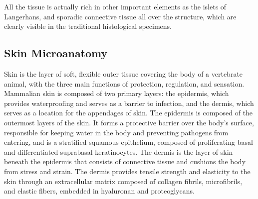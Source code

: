     All the tissue is actually rich in other important elements as the islets of Langerhans, and sporadic connective tissue all over the structure, which are clearly visible in the traditional histological specimens.

\subsection{Skin Microanatomy} \label{ssec:derm_anat}
    Skin is the layer of soft, flexible outer tissue covering the body of a vertebrate animal, with the three main functions of protection, regulation, and sensation. Mammalian skin is composed of two primary layers: the epidermis, which provides waterproofing and serves as a barrier to infection, and the dermis, which serves as a location for the appendages of skin. The epidermis is composed of the outermost layers of the skin. It forms a protective barrier over the body's surface, responsible for keeping water in the body and preventing pathogens from entering, and is a stratified squamous epithelium, composed of proliferating basal and differentiated suprabasal keratinocytes. The dermis is the layer of skin beneath the epidermis that consists of connective tissue and cushions the body from stress and strain. The dermis provides tensile strength and elasticity to the skin through an extracellular matrix composed of collagen fibrils, microfibrils, and elastic fibers, embedded in hyaluronan and proteoglycans.


